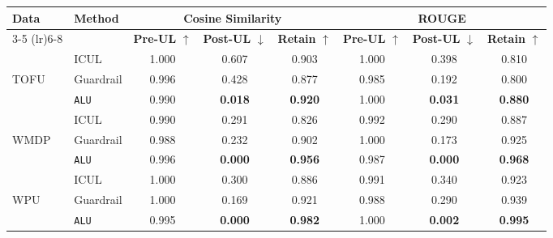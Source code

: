 \begin{table*}[]
    \centering
    \caption{Comparison of Methods using Cosine Similarity and ROUGE Metrics with Llama-3.1 70B}
    \begin{tabular}{llccc|ccc}
        \toprule
        \textbf{Data}&\textbf{Method} & \multicolumn{3}{c}{\textbf{Cosine Similarity}} & \multicolumn{3}{c}{\textbf{ROUGE}} \\
        \cmidrule(lr){3-5} \cmidrule(lr){6-8}
         & & \textbf{Pre-UL} $\uparrow$ & \textbf{Post-UL} $\downarrow$ & \textbf{Retain} $\uparrow$ & \textbf{Pre-UL} $\uparrow$ & \textbf{Post-UL} $\downarrow$ & \textbf{Retain} $\uparrow$ \\
        \midrule
        &ICUL & 1.000 & 0.607 & 0.903 & 1.000 & 0.398 & 0.810 \\
        TOFU &Guardrail & 0.996 & 0.428 & 0.877 & 0.985 & 0.192 & 0.800 \\
        &\texttt{ALU}  & 0.990 & \textbf{0.018} & \textbf{0.920} & 1.000 & \textbf{0.031} & \textbf{0.880} \\
        \midrule
        &ICUL  & 0.990 & 0.291 & 0.826 & 0.992 & 0.290 & 0.887 \\
        WMDP & Guardrail  & 0.988  & 0.232 & 0.902 & 1.000 & 0.173 & 0.925 \\
        &\texttt{ALU} & 0.996  & \textbf{0.000} & \textbf{0.956} & 0.987 & \textbf{0.000} & \textbf{0.968} \\
        \midrule
        &ICUL  & 1.000 & 0.300 & 0.886 & 0.991 & 0.340 & 0.923 \\
        WPU &Guardrail & 1.000 & 0.169 & 0.921 & 0.988 & 0.290 & 0.939 \\
        &\texttt{ALU} & 0.995 & \textbf{0.000} & \textbf{0.982} & 1.000 & \textbf{0.002} & \textbf{0.995} \\
        
        \bottomrule
    \end{tabular}
\label{tab:t13}    
\end{table*}

